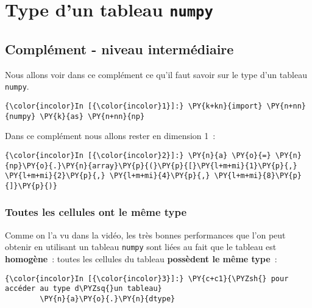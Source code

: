     
    
    
    

    

    \hypertarget{type-dun-tableau-numpy}{%
\section{\texorpdfstring{Type d'un tableau
\texttt{numpy}}{Type d'un tableau numpy}}\label{type-dun-tableau-numpy}}

    \hypertarget{compluxe9ment---niveau-intermuxe9diaire}{%
\subsection{Complément - niveau
intermédiaire}\label{compluxe9ment---niveau-intermuxe9diaire}}

    Nous allons voir dans ce complément ce qu'il faut savoir sur le type
d'un tableau \texttt{numpy}.

    \begin{Verbatim}[commandchars=\\\{\}]
{\color{incolor}In [{\color{incolor}1}]:} \PY{k+kn}{import} \PY{n+nn}{numpy} \PY{k}{as} \PY{n+nn}{np}
\end{Verbatim}


    Dans ce complément nous allons rester en dimension 1~:

    \begin{Verbatim}[commandchars=\\\{\}]
{\color{incolor}In [{\color{incolor}2}]:} \PY{n}{a} \PY{o}{=} \PY{n}{np}\PY{o}{.}\PY{n}{array}\PY{p}{(}\PY{p}{[}\PY{l+m+mi}{1}\PY{p}{,} \PY{l+m+mi}{2}\PY{p}{,} \PY{l+m+mi}{4}\PY{p}{,} \PY{l+m+mi}{8}\PY{p}{]}\PY{p}{)}
\end{Verbatim}


    \hypertarget{toutes-les-cellules-ont-le-muxeame-type}{%
\subsubsection{Toutes les cellules ont le même
type}\label{toutes-les-cellules-ont-le-muxeame-type}}

    Comme on l'a vu dans la vidéo, les très bonnes performances que l'on
peut obtenir en utilisant un tableau \texttt{numpy} sont liées au fait
que le tableau est \textbf{homogène}~: toutes les cellules du tableau
\textbf{possèdent le même type}~:

    \begin{Verbatim}[commandchars=\\\{\}]
{\color{incolor}In [{\color{incolor}3}]:} \PY{c+c1}{\PYZsh{} pour accéder au type d\PYZsq{}un tableau}
        \PY{n}{a}\PY{o}{.}\PY{n}{dtype}
\end{Verbatim}


